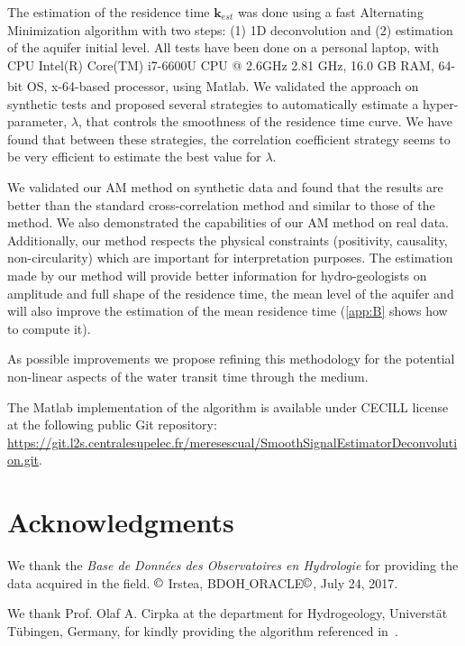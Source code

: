 \documentclass[]{elsarticle} %
\begin{document}
The estimation of the residence time $\textbf{k}_{est}$ was done using a fast Alternating Minimization algorithm with two steps: (1) 1D deconvolution and (2) estimation of the aquifer initial level. All tests have been done on a personal laptop, with CPU Intel(R) Core(TM) i7-6600U CPU @ 2.6GHz 2.81 GHz, 16.0 GB RAM, 64-bit OS, x-64-based processor, using Matlab\textsuperscript{\tiny\textregistered}. We validated the approach on synthetic tests and proposed several strategies to automatically estimate a hyper-parameter, $\lambda$, that controls the smoothness of the residence time curve. We have found that between these strategies, the correlation coefficient strategy seems to be very efficient to estimate the best value for $\lambda$.

We validated our AM method on synthetic data and found that the results are better than the standard cross-correlation method and similar to those of the \cite{Z_Hydro_Cirpka2007} method. We also demonstrated the capabilities of our AM method on real data. Additionally, our method respects the physical constraints (positivity, causality, non-circularity) which are important for interpretation purposes. The estimation made by our method will provide better information for hydro-geologists on amplitude and full shape of the residence time, the mean level of the aquifer and will also improve the estimation of the mean residence time (\ref{app:B} shows how to compute it).

As possible improvements we propose refining this methodology for the potential non-linear aspects of the water transit time through the medium.

The Matlab implementation of the algorithm is available under CECILL license at the following public Git repository: \url{https://git.l2s.centralesupelec.fr/meresescual/SmoothSignalEstimatorDeconvolution.git}.


\section*{Acknowledgments}

We thank the \textit{Base de Données des Observatoires en Hydrologie} for providing the data acquired in the field.
$\copyright$  Irstea, BDOH$\_$ORACLE$\copyright$, July 24, 2017. 

We thank Prof. Olaf A. Cirpka at the department for Hydrogeology, Universt{\"a}t T{\"u}bingen, Germany, for kindly providing the algorithm referenced in~\cite{Z_Hydro_Cirpka2007}.
\end{document}
